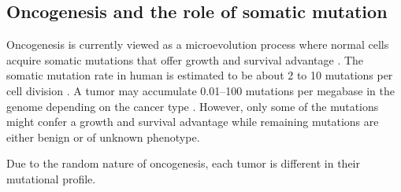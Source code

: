 \subsection{Oncogenesis and the role of somatic mutation}
Oncogenesis is currently viewed as a microevolution process where normal cells acquire somatic mutations that offer growth and survival advantage \cite{strattonmr_futrealpa:CancerGenome2009,martincorenai_campbellpj:SomaticMutation2015}. The somatic mutation rate in human is estimated to be about 2 to 10 mutations per cell division \cite{lynchm_lynchm:RateMolecular2010,milhollandb_vijgj:DifferencesGermline2017}. A tumor may accumulate 0.01--100 mutations per megabase in the genome depending on the cancer type \cite{lawrencems_getzg:MutationalHeterogeneity2013,martincorenai_campbellpj:SomaticMutation2015}. However, only some of the mutations might confer a growth and survival advantage while remaining mutations are either benign or of unknown phenotype.

Due to the random nature of oncogenesis, each tumor is different in their mutational profile.




